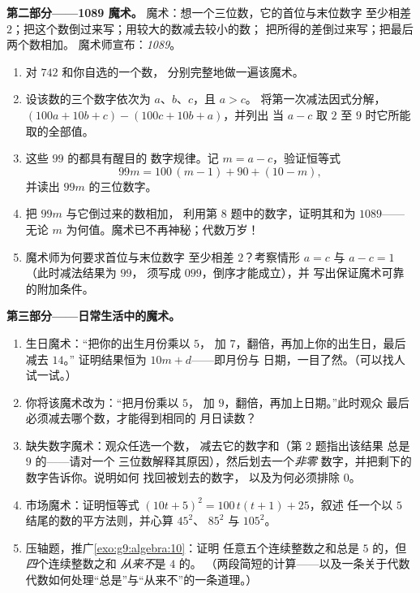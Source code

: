 \begin{problem}
\medskip
\noindent\textbf{第二部分——1089 魔术。}
魔术：想一个三位数，它的首位与末位数字
至少相差 $2$；把这个数倒过来写；用较大的数减去较小的数；
把所得的差倒过来写；把最后两个数相加。
魔术师宣布：\emph{1089}。
\begin{enumerate}[resume]
  \item 对 $742$ 和你自选的一个数，
        分别完整地做一遍该魔术。
  \item 设该数的三个数字依次为 $a$、$b$、$c$，且 $a > c$。
        将第一次减法因式分解，
        $(100a + 10b + c) - (100c + 10b + a)$，并列出
        当 $a - c$ 取 $2$ 至 $9$ 时它所能取的全部值。
  \item 这些 $99$ 的都具有醒目的
        数字规律。记 $m = a - c$，验证恒等式
        \[
        99m = 100\,(m - 1) + 90 + (10 - m),
        \]
        并读出 $99m$ 的三位数字。
  \item 把 $99m$ 与它倒过来的数相加，
        利用第 8 题中的数字，证明其和为 $1089$——
        无论 $m$ 为何值。魔术已不再神秘；代数万岁！
  \item 魔术师为何要求首位与末位数字
        至少相差 $2$？考察情形 $a = c$ 与
        $a - c = 1$（此时减法结果为 $99$，
        须写成 $099$，倒序才能成立），并
        写出保证魔术可靠的附加条件。
\end{enumerate}

\medskip
\noindent\textbf{第三部分——日常生活中的魔术。}
\begin{enumerate}[resume]
  \item 生日魔术：“把你的出生月份乘以 $5$，
        加 $7$，翻倍，再加上你的出生日，最后减去 $14$。”
        证明结果恒为 $10m + d$——即月份与
        日期，一目了然。（可以找人试一试。）
  \item 你将该魔术改为：“把月份乘以 $5$，
        加 $9$，翻倍，再加上日期。”此时观众
        最后必须减去哪个数，才能得到相同的
        月日读数？
  \item 缺失数字魔术：观众任选一个数，
        减去它的数字和（第 2 题指出该结果
        总是 $9$ 的——请对一个
        三位数解释其原因），然后划去一个\emph{非零}
        数字，并把剩下的数字告诉你。说明如何
        找回被划去的数字，
        以及为何必须排除 $0$。
  \item 市场魔术：证明恒等式
        $(10t + 5)^2 = 100\,t(t+1) + 25$，叙述
        任一个以 $5$ 结尾的数的平方法则，并心算 $45^2$、
        $85^2$ 与 $105^2$。
  \item 压轴题，推广\cref{exo:g9:algebra:10}：证明
        任意五个连续整数之和总是
        $5$ 的，但\emph{四}个连续整数之和
        \emph{从来不}是 $4$ 的。
        （两段简短的计算——以及一条关于代数
        代数如何处理“总是”与“从来不”的一条道理。）
\end{enumerate}
\end{problem}

